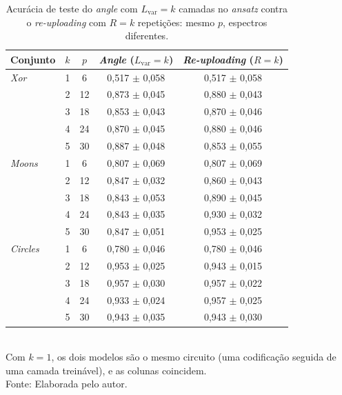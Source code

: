 \begin{table}[htb]
\centering
\caption[\textit{Angle} e \textit{re-uploading} com o mesmo número de parâmetros]{Acurácia de teste do \textit{angle} com $L_\text{var} = k$ camadas no \textit{ansatz} contra o \textit{re-uploading} com $R = k$ repetições: mesmo $p$, espectros diferentes.}
\label{tab:mesmo-p}
\begin{tabular}{lcccc}
\toprule
Conjunto & $k$ & $p$ & \textit{Angle} ($L_\text{var} = k$) & \textit{Re-uploading} ($R = k$) \\
\midrule
\textit{Xor} & 1 & 6 & 0,517 $\pm$ 0,058 & 0,517 $\pm$ 0,058 \\
 & 2 & 12 & 0,873 $\pm$ 0,045 & 0,880 $\pm$ 0,043 \\
 & 3 & 18 & 0,853 $\pm$ 0,043 & 0,870 $\pm$ 0,046 \\
 & 4 & 24 & 0,870 $\pm$ 0,045 & 0,880 $\pm$ 0,046 \\
 & 5 & 30 & 0,887 $\pm$ 0,048 & 0,853 $\pm$ 0,055 \\
\midrule
\textit{Moons} & 1 & 6 & 0,807 $\pm$ 0,069 & 0,807 $\pm$ 0,069 \\
 & 2 & 12 & 0,847 $\pm$ 0,032 & 0,860 $\pm$ 0,043 \\
 & 3 & 18 & 0,843 $\pm$ 0,053 & 0,890 $\pm$ 0,045 \\
 & 4 & 24 & 0,843 $\pm$ 0,035 & 0,930 $\pm$ 0,032 \\
 & 5 & 30 & 0,847 $\pm$ 0,051 & 0,953 $\pm$ 0,025 \\
\midrule
\textit{Circles} & 1 & 6 & 0,780 $\pm$ 0,046 & 0,780 $\pm$ 0,046 \\
 & 2 & 12 & 0,953 $\pm$ 0,025 & 0,943 $\pm$ 0,015 \\
 & 3 & 18 & 0,957 $\pm$ 0,030 & 0,957 $\pm$ 0,022 \\
 & 4 & 24 & 0,933 $\pm$ 0,024 & 0,957 $\pm$ 0,025 \\
 & 5 & 30 & 0,943 $\pm$ 0,035 & 0,943 $\pm$ 0,030 \\
\bottomrule
\end{tabular}
\\[2pt]
{\footnotesize Com $k = 1$, os dois modelos são o mesmo circuito (uma codificação seguida de uma camada treinável), e as colunas coincidem.}
\\[2pt]
{\footnotesize Fonte: Elaborada pelo autor.}
\end{table}
